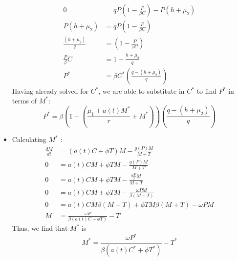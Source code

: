\documentclass[12pt]{article}
\begin{document}
\begin{itemize}
\begin{align*}
                    0 &= qP\left(1-\frac{P}{\beta C}\right) - P(h + \mu_{2})\\
                    P(h+ \mu_{2}) &= qP\left(1-\frac{P}{\beta C}\right)\\
                    \frac{(h+ \mu_{2})}{q} &= \left(1-\frac{P}{\beta C}\right)\\
                    \frac{P}{\beta} C &= 1 - \frac{h+\mu_{2}}{q}\\
                    P^{*} &= \beta C^{*} \left(\frac{q-(h+\mu_{2})}{q}\right)
                \end{align*}
                Having already solved for $C^{*}$, we are able to substitute in $C^{*}$ to find $P^{*}$ in terms of $M^{*}$: 
                \begin{equation*}
                    P^{*} = \beta \left(1- \left(\frac{\mu_{1} + a(t)M^{*}}{r} + M^{*} \right) \right) \left(\frac{q-(h+\mu_{2})}{q} \right)
                \end{equation*}
            \item Calculating $M^{*}$ :
                \begin{align*}
                    \frac{dM}{dt} &= (a(t)C+ \phi T)M - \frac{g(P)M}{M+T} \\
                    0 &= a(t)CM+ \phi TM - \frac{g(P)M}{M+T} \\
                    0 &= a(t)CM+ \phi TM - \frac{\frac{\omega P}{\beta}M}{M+T} \\
                    0 &= a(t)CM+ \phi TM - \frac{\omega PM}{\beta(M+T)} \\
                    0 &= a(t)CM\beta(M+T)+ \phi TM\beta(M+T) - \omega PM \\
                    M &= \frac{\omega P}{\beta(a(t)C+\phi T)} - T
                \end{align*}
                Thus, we find that $M^{*}$ is
                \begin{equation*}
                    M^{*} = \frac{\omega P^{*}}{\beta(a(t)C^{*}+\phi T^{*})} - T^{*}
                \end{equation*}
        \end{itemize}
        
\end{document}
